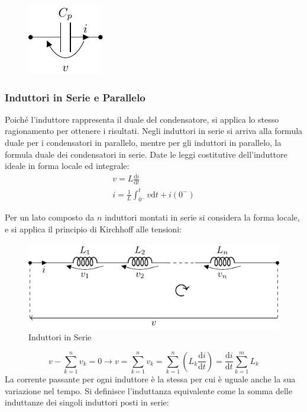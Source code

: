 \documentclass{article}
\newcommand{\df}{\mathrm{d}}
\numberwithin{equation}{subsection}
\begin{document}
\begin{figure}[H]%
    \centering
    \includegraphics{condensatore-parallelo-equivalente.pdf}%
    \label{fig:condensatore-parallelo-equivalente}
\end{figure}

\subsubsection{Induttori in Serie e Parallelo}

Poiché l'induttore rappresenta il duale del condensatore, si applica lo stesso ragionamento per ottenere i risultati. Negli induttori in serie si arriva alla formula 
duale per i condensatori in parallelo, mentre per gli induttori in parallelo, la formula duale dei condensatori in serie. 
Date le leggi costitutive dell'induttore ideale in forma locale ed integrale:
\begin{gather*}
    v=L\displaystyle\frac{\df i}{\df t}\\
    i=\displaystyle\frac{1}{L}\int_{0^-}^t v\df t+i(0^-)
\end{gather*}



Per un lato composto da $n$ induttori montati in serie si considera la forma locale, e si applica il principio di Kirchhoff alle tensioni:
\begin{figure}[H]%
    \centering
    \includegraphics{induttore-serie.pdf}%
    \caption{Induttori in Serie}%
    \label{fig:induttore-serie}
\end{figure}

\begin{equation*}
    v-\displaystyle\sum_{k=1}^nv_k=0\to v=\sum_{k=1}^nv_k=\sum_{k=1}^n\left(L_k\frac{\df i}{\df t}\right)=\frac{\df i}{\df t}\sum_{k=1}^mL_k
\end{equation*}
La corrente passante per ogni induttore è la stessa per cui è uguale anche la sua variazione nel tempo. Si definisce l'induttanza equivalente come la somma delle induttanze 
dei singoli induttori posti in serie:
\end{document}
